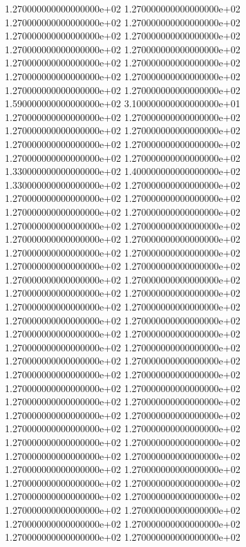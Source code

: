 1.270000000000000000e+02 1.270000000000000000e+02 1.270000000000000000e+02 1.270000000000000000e+02 1.270000000000000000e+02 1.270000000000000000e+02 1.270000000000000000e+02 1.270000000000000000e+02 1.270000000000000000e+02 1.270000000000000000e+02 1.270000000000000000e+02 1.270000000000000000e+02 1.270000000000000000e+02 1.270000000000000000e+02 1.590000000000000000e+02 3.100000000000000000e+01 1.270000000000000000e+02 1.270000000000000000e+02 1.270000000000000000e+02 1.270000000000000000e+02 1.270000000000000000e+02 1.270000000000000000e+02 1.270000000000000000e+02 1.270000000000000000e+02 1.330000000000000000e+02 1.400000000000000000e+02 1.330000000000000000e+02 1.270000000000000000e+02 1.270000000000000000e+02 1.270000000000000000e+02 1.270000000000000000e+02 1.270000000000000000e+02 1.270000000000000000e+02 1.270000000000000000e+02 1.270000000000000000e+02 1.270000000000000000e+02 1.270000000000000000e+02 1.270000000000000000e+02 1.270000000000000000e+02 1.270000000000000000e+02 1.270000000000000000e+02 1.270000000000000000e+02 1.270000000000000000e+02 1.270000000000000000e+02 1.270000000000000000e+02 1.270000000000000000e+02 1.270000000000000000e+02 1.270000000000000000e+02 1.270000000000000000e+02 1.270000000000000000e+02 1.270000000000000000e+02 1.270000000000000000e+02 1.270000000000000000e+02 1.270000000000000000e+02 1.270000000000000000e+02 1.270000000000000000e+02 1.270000000000000000e+02 1.270000000000000000e+02 1.270000000000000000e+02 1.270000000000000000e+02 1.270000000000000000e+02 1.270000000000000000e+02 1.270000000000000000e+02 1.270000000000000000e+02 1.270000000000000000e+02 1.270000000000000000e+02 1.270000000000000000e+02 1.270000000000000000e+02 1.270000000000000000e+02 1.270000000000000000e+02 1.270000000000000000e+02 1.270000000000000000e+02 1.270000000000000000e+02 1.270000000000000000e+02 1.270000000000000000e+02 1.270000000000000000e+02 1.270000000000000000e+02 1.270000000000000000e+02 1.270000000000000000e+02 1.270000000000000000e+02
